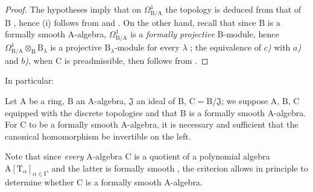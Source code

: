 \begin{proof}
The hypotheses imply that on $\Omega^1_{\mathrm{B}/\mathrm{A}}$ the topology
is deduced from that of $\mathrm{B}$ , hence (i) follows from
 and . On the other hand, recall
 that since $\mathrm{B}$ is a formally smooth
$\mathrm{A}$-algebra, $\Omega^1_{\mathrm{B}/\mathrm{A}}$ is a \emph{formally
projective} $\mathrm{B}$-module, hence
$\Omega^1_{\mathrm{B}/\mathrm{A}}\otimes_\mathrm{B}\mathrm{B}_\lambda$ is a
projective $\mathrm{B}_\lambda$-module for every $\lambda$
; the equivalence of \emph{$c$)} with \emph{$a$)} and \emph{$b$)}, when $\mathrm{C}$
is preadmissible, then follows from .
\end{proof}

In particular:
\begin{corollary}[22.6.3]
\label{0.22.6.3}
Let $\mathrm{A}$ be a ring, $\mathrm{B}$ an $\mathrm{A}$-algebra, $\mathfrak{J}$ an ideal of $\mathrm{B}$, $\mathrm{C}=\mathrm{B}/\mathfrak{J}$; we suppose $\mathrm{A}$, $\mathrm{B}$, $\mathrm{C}$ equipped with the discrete topologies and that $\mathrm{B}$ is a formally smooth $\mathrm{A}$-algebra.
For $\mathrm{C}$ to be a formally smooth $\mathrm{A}$-algebra, it is necessary and sufficient that the canonical homomorphism  be invertible on the left.
\end{corollary}

Note that since \emph{every} $\mathrm{A}$-algebra $\mathrm{C}$ is a quotient of a polynomial algebra $\mathrm{A}[\mathrm{T}_\alpha]_{\alpha\in\mathrm{I}}$, and the latter is formally smooth , the criterion  allows in principle to determine whether $\mathrm{C}$ is a formally smooth $\mathrm{A}$-algebra.

